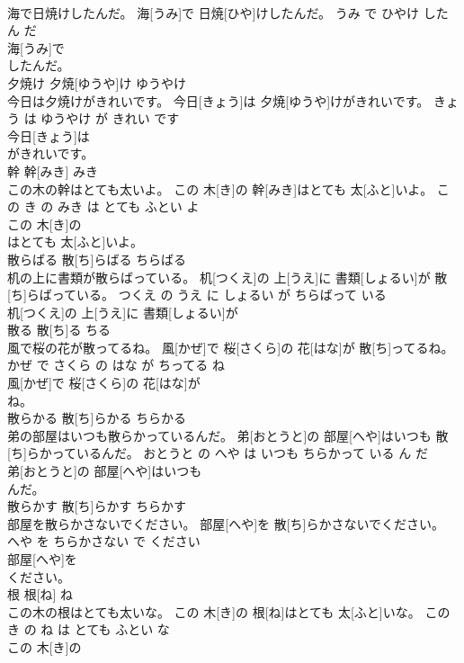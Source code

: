 \documentclass[8pt]{extreport}
\begin{document}
\begin{CJK}{UTF8}{min}
\\	海で日焼けしたんだ。	海[うみ]で 日焼[ひや]けしたんだ。	うみ で ひやけ した ん だ	
\\	海[うみ]で
\\	したんだ。			
\\	夕焼け	夕焼[ゆうや]け	ゆうやけ	
\\	今日は夕焼けがきれいです。	今日[きょう]は 夕焼[ゆうや]けがきれいです。	きょう は ゆうやけ が きれい です	
\\	今日[きょう]は
\\	がきれいです。			
\\	幹	幹[みき]	みき	
\\	この木の幹はとても太いよ。	この 木[き]の 幹[みき]はとても 太[ふと]いよ。	この き の みき は とても ふとい よ	
\\	この 木[き]の
\\	はとても 太[ふと]いよ。			
\\	散らばる	散[ち]らばる	ちらばる	
\\	机の上に書類が散らばっている。	机[つくえ]の 上[うえ]に 書類[しょるい]が 散[ち]らばっている。	つくえ の うえ に しょるい が ちらばって いる	
\\	机[つくえ]の 上[うえ]に 書類[しょるい]が
\\	散る	散[ち]る	ちる	
\\	風で桜の花が散ってるね。	風[かぜ]で 桜[さくら]の 花[はな]が 散[ち]ってるね。	かぜ で さくら の はな が ちってる ね	
\\	風[かぜ]で 桜[さくら]の 花[はな]が
\\	ね。			
\\	散らかる	散[ち]らかる	ちらかる	
\\	弟の部屋はいつも散らかっているんだ。	弟[おとうと]の 部屋[へや]はいつも 散[ち]らかっているんだ。	おとうと の へや は いつも ちらかって いる ん だ	
\\	弟[おとうと]の 部屋[へや]はいつも
\\	んだ。			
\\	散らかす	散[ち]らかす	ちらかす	
\\	部屋を散らかさないでください。	部屋[へや]を 散[ち]らかさないでください。	へや を ちらかさない で ください	
\\	部屋[へや]を
\\	ください。			
\\	根	根[ね]	ね	
\\	この木の根はとても太いな。	この 木[き]の 根[ね]はとても 太[ふと]いな。	この き の ね は とても ふとい な	
\\	この 木[き]の

\end{CJK}
\end{document}
